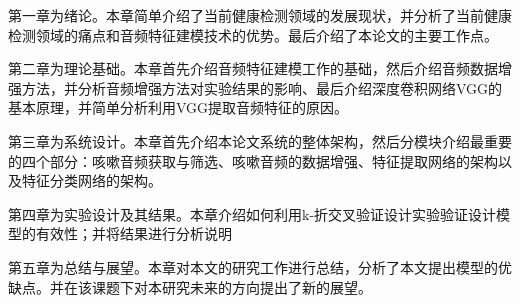 第一章为绪论。本章简单介绍了当前健康检测领域的发展现状，并分析了当前健康检测领域的痛点和音频特征建模技术的优势。最后介绍了本论文的主要工作点。

第二章为理论基础。本章首先介绍音频特征建模工作的基础，然后介绍音频数据增强方法，并分析音频增强方法对实验结果的影响、最后介绍深度卷积网络VGG的基本原理，并简单分析利用VGG提取音频特征的原因。

第三章为系统设计。本章首先介绍本论文系统的整体架构，然后分模块介绍最重要的四个部分：咳嗽音频获取与筛选、咳嗽音频的数据增强、特征提取网络的架构以及特征分类网络的架构。

第四章为实验设计及其结果。本章介绍如何利用k-折交叉验证设计实验验证设计模型的有效性；并将结果进行分析说明

第五章为总结与展望。本章对本文的研究工作进行总结，分析了本文提出模型的优缺点。并在该课题下对本研究未来的方向提出了新的展望。
